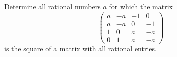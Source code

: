 Determine all rational numbers $a$ for which the matrix
$$\begin{pmatrix}
    a       & -a & -1 & 0 \\
    a       & -a & 0 & -1 \\
    1  & 0 & a & -a\\
    0      & 1 & a &  -a
\end{pmatrix}$$is the square of a matrix with all rational entries.

